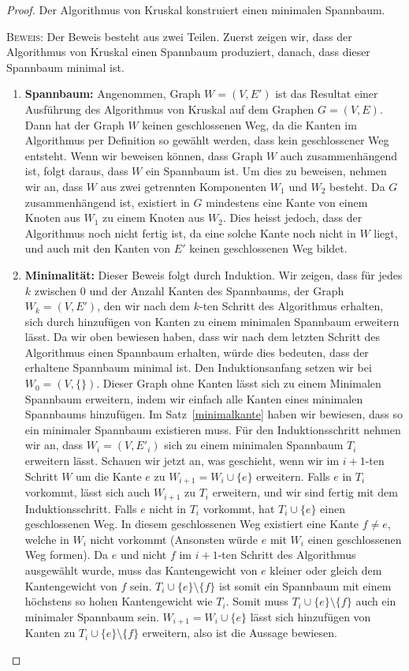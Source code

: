 \documentclass[12pt,a4paper]{report}
\theoremstyle{break}
\theoremstyle{plain}
\newtheorem{proof}{Satz}[section]
\begin{document}
\begin{proof}\label{kruskproof}Der Algorithmus von Kruskal konstruiert
  einen minimalen Spannbaum.

 \bigskip\noindent\textsc{Beweis:} Der Beweis besteht aus zwei Teilen. Zuerst zeigen wir, dass der Algorithmus von Kruskal einen Spannbaum produziert, danach, dass dieser Spannbaum minimal ist.
 
 \begin{enumerate}
\item \textbf{Spannbaum:} Angenommen, Graph $W=(V,E')$ ist das Resultat einer Ausf\"{u}hrung des Algorithmus von Kruskal auf dem Graphen $G=(V,E)$. Dann hat der Graph $W$ keinen geschlossenen Weg, da die Kanten im Algorithmus per Definition so gew\"{a}hlt werden, dass kein geschlossener Weg entsteht. Wenn wir beweisen k\"{o}nnen, dass Graph $W$ auch zusammenh\"{a}ngend ist, folgt daraus, dass $W$ ein Spannbaum ist. Um dies zu beweisen, nehmen wir an, dass $W$ aus zwei getrennten Komponenten $W_1$ und $W_2$ besteht. Da $G$ zusammenh\"{a}ngend ist, existiert in $G$ mindestens eine Kante von einem Knoten aus $W_1$ zu einem Knoten aus $W_2$. Dies heisst jedoch, dass der Algorithmus noch nicht fertig ist, da eine solche Kante noch nicht in $W$ liegt, und auch mit den Kanten von $E'$ keinen geschlossenen Weg bildet.
\item \textbf{Minimalit\"{a}t:} Dieser Beweis folgt durch Induktion. Wir zeigen, dass f\"{u}r jedes $k$ zwischen 0 und der Anzahl Kanten des Spannbaums, der Graph $W_k=(V,E')$, den wir nach dem $k$-ten Schritt des Algorithmus erhalten, sich durch hinzuf\"{u}gen von Kanten zu einem minimalen Spannbaum erweitern l\"{a}sst. Da wir oben bewiesen haben, dass wir nach dem letzten Schritt des Algorithmus einen Spannbaum erhalten, w\"{u}rde dies bedeuten, dass der erhaltene Spannbaum minimal ist. Den Induktionsanfang setzen wir bei $W_0=(V,\{\})$. Dieser Graph ohne Kanten l\"{a}sst sich zu einem Minimalen Spannbaum erweitern, indem wir einfach alle Kanten eines minimalen Spannbaums hinzuf\"{u}gen. Im Satz~\ref{minimalkante} haben wir bewiesen, dass so ein minimaler Spannbaum existieren muss. F\"{u}r den Induktionsschritt nehmen wir an, dass $W_i=(V,E'_i)$ sich zu einem minimalen Spannbaum $T_i$ erweitern l\"{a}sst. Schauen wir jetzt an, was geschieht, wenn wir im $i+1$-ten Schritt $W$ um die Kante $e$ zu $W_{i+1} = W_i \cup \{e\} $ erweitern. Falls $e$ in $T_i$ vorkommt, l\"{a}sst sich auch $W_{i+1}$ zu $T_i$ erweitern, und wir sind fertig mit dem Induktionsschritt. Falls $e$ nicht in $T_i$ vorkommt, hat $T_i \cup \{e\}$ einen geschlossenen Weg. In diesem geschlossenen Weg existiert eine Kante $f \neq e$, welche in $W_i$ nicht vorkommt (Ansonsten w\"{u}rde $e$ mit $W_i$ einen geschlossenen Weg formen). Da $e$ und nicht $f$ im $i+1$-ten Schritt des Algorithmus ausgew\"{a}hlt wurde, muss das Kantengewicht von $e$ kleiner oder gleich dem Kantengewicht von $f$ sein. $T_i \cup \{e\} \setminus \{f\}$ ist somit ein Spannbaum mit einem h\"{o}chstens so hohen Kantengewicht wie $T_i$. Somit muss $T_i \cup \{e\} \setminus \{f\}$ auch ein minimaler Spannbaum sein. $W_{i+1} = W_i \cup \{e\} $ l\"{a}sst sich hinzuf\"{u}gen von Kanten zu $T_i \cup \{e\} \setminus \{f\}$ erweitern, also ist die Aussage bewiesen.

\end{enumerate}
\end{proof}
\end{document}
